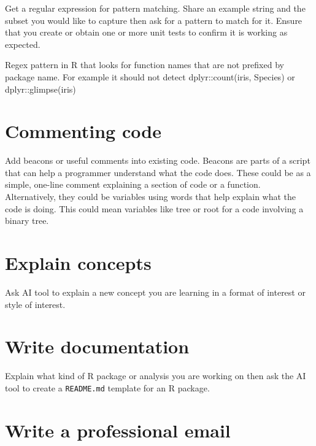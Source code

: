 \documentclass[
  letterpaper,
  DIV=11,
  numbers=noendperiod]{scrreprt}
\newenvironment{Shaded}{\begin{snugshade}}{\end{snugshade}}
\newcommand{\InformationTok}[1]{\textcolor[rgb]{0.37,0.37,0.37}{#1}}
\newcommand{\NormalTok}[1]{\textcolor[rgb]{0.00,0.23,0.31}{#1}}
\begin{document}
Get a regular expression for pattern matching. Share an example string
and the subset you would like to capture then ask for a pattern to match
for it. Ensure that you create or obtain one or more unit tests to
confirm it is working as expected.

\begin{Shaded}
\begin{Highlighting}[]
\NormalTok{Regex pattern in R that looks for function names that are }
\NormalTok{not prefixed by package name. For example it should not }
\NormalTok{detect }\InformationTok{\textasciigrave{}dplyr::count(iris, Species)\textasciigrave{}}\NormalTok{ or }
\InformationTok{\textasciigrave{}dplyr::glimpse(iris)\textasciigrave{}}
\end{Highlighting}
\end{Shaded}

\hypertarget{commenting-code}{%
\section{Commenting code}\label{commenting-code}}

Add beacons or useful comments into existing code. Beacons are parts of
a script that can help a programmer understand what the code does. These
could be as a simple, one-line comment explaining a section of code or a
function. Alternatively, they could be variables using words that help
explain what the code is doing. This could mean variables like tree or
root for a code involving a binary tree.

\hypertarget{explain-concepts}{%
\section{Explain concepts}\label{explain-concepts}}

Ask AI tool to explain a new concept you are learning in a format of
interest or style of interest.

\hypertarget{write-documentation}{%
\section{Write documentation}\label{write-documentation}}

Explain what kind of R package or analysis you are working on then ask
the AI tool to create a \texttt{README.md} template for an R package.

\hypertarget{write-a-professional-email}{%
\section{Write a professional email}\label{write-a-professional-email}}
\end{document}
